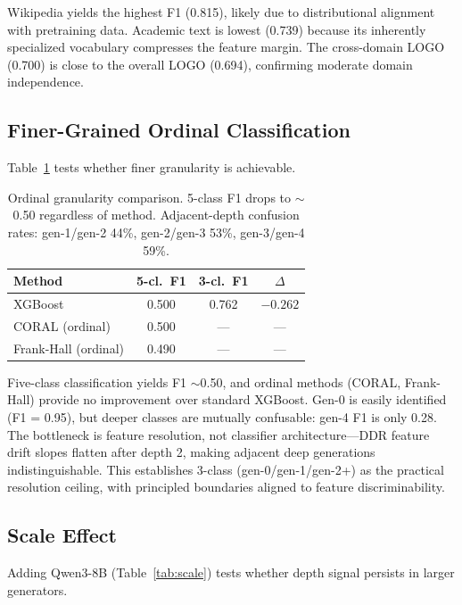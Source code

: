 \documentclass[11pt,a4paper]{article}
\begin{document}
Wikipedia yields the highest F1 (0.815), likely due to distributional alignment with pretraining data. Academic text is lowest (0.739) because its inherently specialized vocabulary compresses the feature margin. The cross-domain LOGO (0.700) is close to the overall LOGO (0.694), confirming moderate domain independence.

\subsection{Finer-Grained Ordinal Classification}
\label{sec:ordinal}

Table~\ref{tab:ordinal} tests whether finer granularity is achievable.

\begin{table}[t]
\centering
\small
\begin{tabular}{lccc}
\toprule
\textbf{Method} & \textbf{5-cl.~F1} & \textbf{3-cl.~F1} & \textbf{$\Delta$} \\
\midrule
XGBoost & 0.500 & 0.762 & $-0.262$ \\
CORAL (ordinal) & 0.500 & --- & --- \\
Frank-Hall (ordinal) & 0.490 & --- & --- \\
\bottomrule
\end{tabular}
\caption{Ordinal granularity comparison. 5-class F1 drops to ${\sim}$0.50 regardless of method. Adjacent-depth confusion rates: gen-1/gen-2 44\%, gen-2/gen-3 53\%, gen-3/gen-4 59\%.}
\label{tab:ordinal}
\end{table}

Five-class classification yields F1 ${\sim}$0.50, and ordinal methods (CORAL, Frank-Hall) provide no improvement over standard XGBoost. Gen-0 is easily identified (F1 = 0.95), but deeper classes are mutually confusable: gen-4 F1 is only 0.28. The bottleneck is feature resolution, not classifier architecture---DDR feature drift slopes flatten after depth 2, making adjacent deep generations indistinguishable. This establishes 3-class (gen-0/gen-1/gen-2+) as the practical resolution ceiling, with principled boundaries aligned to feature discriminability.

\subsection{Scale Effect}
\label{sec:scale}

Adding Qwen3-8B (Table~\ref{tab:scale}) tests whether depth signal persists in larger generators.
\end{document}
